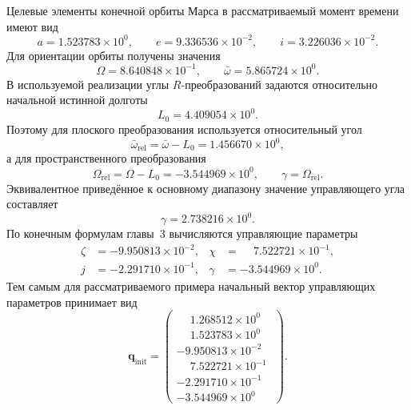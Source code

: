 Целевые элементы конечной орбиты Марса в рассматриваемый момент времени имеют вид
\begin{equation}
a=1.523783\times10^{0},\qquad
e=9.336536\times10^{-2},\qquad
i=3.226036\times10^{-2}.
\end{equation}
Для ориентации орбиты получены значения
\begin{equation}
\Omega=8.640848\times10^{-1},
\qquad
\bar{\omega}=5.865724\times10^{0}.
\end{equation}
В используемой реализации углы \(R\)-преобразований задаются относительно начальной истинной долготы
\begin{equation}
L_0=4.409054\times10^{0}.
\end{equation}
Поэтому для плоского преобразования используется относительный угол
\begin{equation}
\bar{\omega}_{\mathrm{rel}}=\bar{\omega}-L_0=1.456670\times10^{0},
\end{equation}
а для пространственного преобразования
\begin{equation}
\Omega_{\mathrm{rel}}=\Omega-L_0=-3.544969\times10^{0},
\qquad
\gamma=\Omega_{\mathrm{rel}}.
\end{equation}
Эквивалентное приведённое к основному диапазону значение управляющего угла составляет
\begin{equation}
\gamma=2.738216\times10^{0}.
\end{equation}
По конечным формулам главы~3 вычисляются управляющие параметры
\begin{equation}
\begin{aligned}
	\zeta &= -9.950813\times10^{-2}, &
	\chi &= \phantom{-}7.522721\times10^{-1},\\
	j &= -2.291710\times10^{-1}, &
	\gamma &= -3.544969\times10^{0}.
\end{aligned}
\end{equation}
Тем самым для рассматриваемого примера начальный вектор управляющих параметров принимает вид
\begin{equation}
	\mathbf q_{\mathrm{init}}=
	\begin{pmatrix}
		\phantom{-}1.268512\times10^{0\phantom{-}}\\
		\phantom{-}1.523783\times10^{0\phantom{-}}\\
		-9.950813\times10^{-2}\\
		\phantom{-}7.522721\times10^{-1}\\
		-2.291710\times10^{-1}\\
		-3.544969\times10^{0\phantom{-}}
	\end{pmatrix}.
\end{equation}

